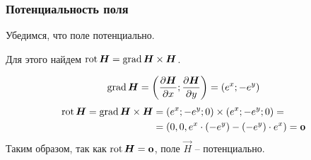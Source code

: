 \begin{frame}\frametitle{Потенциальность поля}
Убедимся, что поле потенциально.

Для этого найдем \( \rot \vec H = \grad \vec H \times \vec H \).

\begin{equation*}
  \grad \vec H = 
  \left( \frac{\partial \vec H}{\partial x};  \frac{\partial \vec H}{\partial y}\right) =
  \left( e^x; -e^{y} \right)
\end{equation*}
\begin{align*}
  \rot \vec H = \grad \vec H \times \vec H &= (e^x; -e^y; 0) \times (e^x; -e^y; 0) = \\
                                           &= (0, 0, e^x \cdot (-e^y) - (-e^y) \cdot e^x) = \vec 0
\end{align*}
Таким образом, так как \(\rot \vec H = \vec 0\), поле \(\vec H\) -- потенциально.

\end{frame}   
